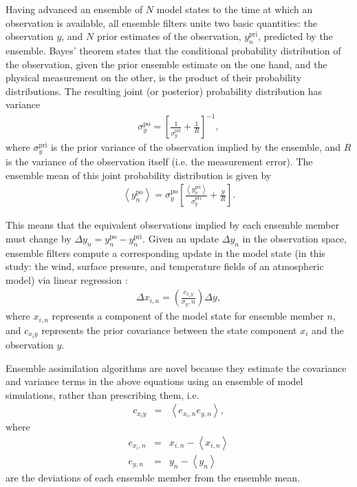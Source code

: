 Having advanced an ensemble of $N$ model states to the time at which an observation is available, 
all ensemble filters unite two basic quantities: the observation $y$, and $N$ prior estimates of the observation, $y^{\text{pri}}_{n}$, predicted by the ensemble. 
Bayes' theorem states that the conditional probability distribution of the observation, given the prior ensemble estimate on the one hand, and the physical measurement on the other, is the product of their probability distributions.
The resulting joint (or posterior) probability distribution has variance 
\begin{eqnarray}
	\sigma_y^{\text{po}} = 
\left[
	\frac{1}{\sigma_y^{\text{pri}}}
	+
	\frac{1}{R}
\right]^{-1},
\label{eq:sigma_a}
\end{eqnarray}
where $\sigma_y^{\text{pri}}$ is  the prior variance of the observation implied by the ensemble, and $R$ is the variance of the observation itself (i.e. the measurement error).
The ensemble mean of this joint probability distribution is given by
\begin{eqnarray}
	\left< y^{\text{po}}_n \right> = \sigma_y^{\text{po}} 
	\left[
		\frac{\left< y^{\text{pri}}_n \right>}{\sigma_y^{\text{pri}}} +
		\frac{y}{R} 
	\right].
\label{eq:y_a}
\end{eqnarray}

This means that the equivalent observations implied by each ensemble member must change by $\Delta y_n =  y^{\text{po}}_n - y^{\text{pri}}_n$.
Given an update $\Delta y_n$ in the observation space, ensemble filters compute a corresponding update in the model state (in this study: the wind, surface pressure, and temperature fields of an atmospheric model) via linear regression \citep{Anderson2003}:
\begin{eqnarray}
 \Delta x_{i,n} = 
\left(
	\frac{c_{x_iy}}{\sigma_y,n}
\right)
\Delta y,
\label{eq:state_update}
\end{eqnarray}
where $x_{i,n}$ represents a component of the model state for ensemble member $n$, and $c_{x_iy}$ represents the prior covariance between the state component $x_i$ and the observation $y$.

Ensemble assimilation algorithms are novel because they estimate the covariance and variance terms in the above equations using an ensemble of model simulations, rather than prescribing them, i.e. 
\begin{eqnarray}
c_{x_iy} &=& 
\left<
e_{{x_i},n} 
e_{{y},n}
\right>,
\label{eq:covariance} 
\end{eqnarray}
%
%
%
where 
\begin{eqnarray}
	e_{{x_i},n} &=& x_{i,n} - \left< x_{i,n} \right>   \label{eq:exn} \\
	e_{y,n} &=& y_{n} - \left< y_{n} \right>    \label{eq:eyn}
\end{eqnarray}
are the deviations of each ensemble member from the ensemble mean.

